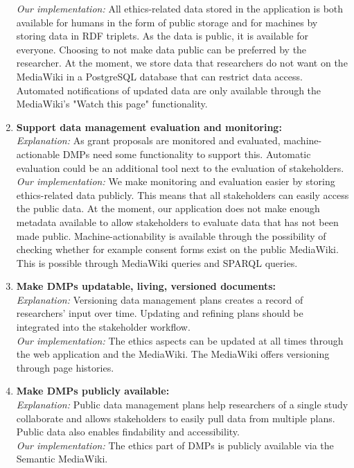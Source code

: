 \documentclass[10pt]{article}
\begin{document}
\begin{enumerate}
\textit{Our implementation:} All ethics-related data stored in the application is both available for humans in the form of public storage and for machines by storing data in RDF triplets. As the data is public, it is available for everyone. Choosing to not make data public can be preferred by the researcher. At the moment, we store data that researchers do not want on the MediaWiki in a PostgreSQL database that can restrict data access. Automated notifications of updated data are only available through the MediaWiki's "Watch this page" functionality.
\item \textbf{Support data management evaluation and monitoring:}  \\
\textit{Explanation:} As grant proposals are monitored and evaluated, machine-actionable DMPs need some functionality to support this. Automatic evaluation could be an additional tool next to the evaluation of stakeholders.\\
\textit{Our implementation:} We make monitoring and evaluation easier by storing ethics-related data publicly. This means that all stakeholders can easily access the public data. At the moment, our application does not make enough metadata available to allow stakeholders to evaluate data that has not been made public. Machine-actionability is available through the possibility of checking whether for example consent forms exist on the public MediaWiki. This is possible through MediaWiki queries and SPARQL queries.
\item \textbf{Make DMPs updatable, living, versioned documents:}  \\
\textit{Explanation:} Versioning data management plans creates a record of researchers' input over time. Updating and refining plans should be integrated into the stakeholder workflow.\\
\textit{Our implementation:} The ethics aspects can be updated at all times through the web application and the MediaWiki. The MediaWiki offers versioning through page histories.
\item \textbf{Make DMPs publicly available:}  \\
\textit{Explanation:} Public data management plans help researchers of a single study collaborate and allows stakeholders to easily pull data from multiple plans. Public data also enables findability and accessibility.\\
\textit{Our implementation:} The ethics part of DMPs is publicly available via the Semantic MediaWiki.
\end{enumerate}
\end{document}
